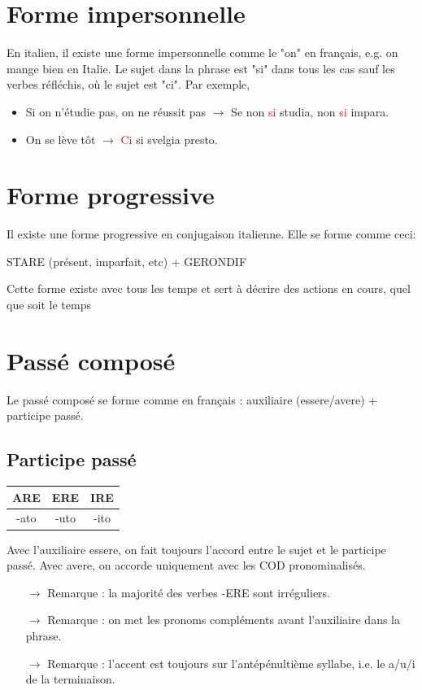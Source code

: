 \documentclass[12pt, openany]{report}
\begin{document}
\section{Forme impersonnelle}
En italien, il existe une forme impersonnelle comme le "on" en français, e.g. on mange bien en Italie. Le sujet dans la phrase est "si" dans tous les cas sauf les verbes réfléchis, où le sujet est "ci". Par exemple,
\begin{itemize}
    \item Si on n'étudie pas, on ne réussit pas $\rightarrow$ Se non \textcolor{red}{si} studia, non \textcolor{red}{si} impara.
    \item On se lève tôt $\rightarrow$ \textcolor{red}{Ci} si svelgia presto.
\end{itemize}
\section{Forme progressive}
Il existe une forme progressive en conjugaison italienne. Elle se forme comme ceci: 
\begin{center}
    STARE (présent, imparfait, etc) + GERONDIF
\end{center}
Cette forme existe avec tous les temps et sert à décrire des actions en cours, quel que soit le temps  
\section{Passé composé}
Le passé composé se forme comme en français : auxiliaire (essere/avere) + participe passé.
\subsection{Participe passé}
\begin{center}
    \begin{tabular}{c|c|c}
        ARE & ERE & IRE\\ \hline
        -ato & -uto & -ito\\
    \end{tabular}
\end{center}
Avec l'auxiliaire essere, on fait toujours l'accord entre le sujet et le participe passé. Avec avere, on accorde uniquement avec les COD pronominalisés. 
\begin{itemize}
    \item [$\to$] Remarque : la majorité des verbes -ERE sont irréguliers. 
    \item [$\to$] Remarque : on met les pronoms compléments avant l'auxiliaire dans la phrase. 
    \item [$\to$] Remarque : l'accent est toujours sur l'antépénultième syllabe, i.e. le a/u/i de la terminaison. 
\end{itemize}
\end{document}
